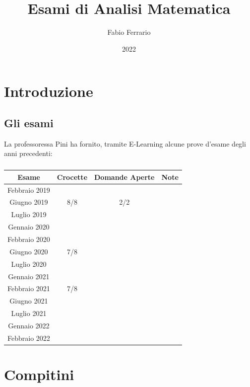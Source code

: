 \documentclass[12pt, a4paper, openany]{book}
\begin{document}
\title{Esami di Analisi Matematica}
\author{Fabio Ferrario}
\date{2022}
\maketitle
\tableofcontents

\chapter{Introduzione}
\section{Gli esami}
La professoressa Pini ha fornito, tramite E-Learning alcune prove d'esame degli anni precedenti:
\paragraph*{}
\begin{tabular}{ |c|c|c|c| }
	\hline
	Esame         & Crocette   & Domande Aperte & Note       \\
	\hline
	Febbraio 2019 &            &                &            \\
	Giugno 2019   & 8/8        & 2/2            & \checkmark \\
	Luglio 2019   &            &                &            \\
	Gennaio 2020  &            &                &            \\
	Febbraio 2020 & \checkmark &                &            \\
	Giugno 2020   & 7/8        &                &            \\
	Luglio 2020   &            &                &            \\
	Gennaio 2021  &            &                &            \\
	Febbraio 2021 & 7/8        &                &            \\
	Giugno 2021   & \checkmark &                &            \\
	Luglio  2021  &            &                &            \\
	Gennaio 2022  &            &                &            \\
	Febbraio 2022 &            &                &            \\
	\hline
\end{tabular}

\chapter{Compitini}
\end{document}
